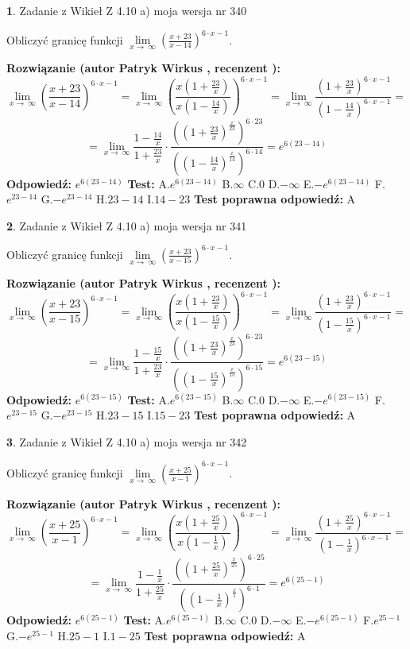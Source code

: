 \documentclass[12pt, a4paper]{article}
\theoremstyle{definition} %
\newtheorem{zad}{}
\newcommand{\zadStart}[1]{\begin{zad}#1\newline}
\newcommand{\zadStop}{\end{zad}}
\newcommand{\rozwStart}[2]{\noindent \textbf{Rozwiązanie (autor #1 , recenzent #2): }\newline}
\newcommand{\rozwStop}{\newline}
\newcommand{\odpStart}{\noindent \textbf{Odpowiedź:}\newline}
\newcommand{\odpStop}{\newline}
\newcommand{\testStart}{\noindent \textbf{Test:}\newline}
\newcommand{\testStop}{\newline}
\newcommand{\kluczStart}{\noindent \textbf{Test poprawna odpowiedź:}\newline}
\newcommand{\kluczStop}{\newline}
\begin{document}
\zadStart{Zadanie z Wikieł Z 4.10 a) moja wersja nr 340}


Obliczyć granicę funkcji  $\lim\limits_{x\to\ \infty}(\frac{x+23}{x-14})^{6\cdot x-1}$.
\zadStop
\rozwStart{Patryk Wirkus}{}
$$\lim\limits_{x\to\ \infty}(\frac{x+23}{x-14})^{6\cdot x-1} = \lim\limits_{x\to\ \infty}(\frac{x(1+\frac{23}{x})}{x(1-\frac{14}{x})})^{6\cdot x-1}=\lim\limits_{x\to\ \infty}\frac{(1+\frac{23}{x})^{6\cdot x-1}}{(1-\frac{14}{x})^{6\cdot x-1}}=$$
$$=\lim\limits_{x\to\ \infty}\frac{1-\frac{14}{x}}{1+\frac{23}{x}}\cdot\frac{((1+\frac{23}{x})^{\frac{x}{23}})^{6\cdot23}}{((1-\frac{14}{x})^{\frac{x}{14}})^{6\cdot14}}=e^{6(23-14)}$$
\rozwStop
\odpStart
$e^{6(23-14)}$
\odpStop
\testStart
A.$e^{6(23-14)}$ B.$\infty$ C.$0$ D.$-\infty$ E.$-e^{6(23-14)}$
F.$e^{23-14}$ G.$-e^{23-14}$
H.$23-14$
I.$14-23$
\testStop
\kluczStart
A
\kluczStop



\zadStart{Zadanie z Wikieł Z 4.10 a) moja wersja nr 341}


Obliczyć granicę funkcji  $\lim\limits_{x\to\ \infty}(\frac{x+23}{x-15})^{6\cdot x-1}$.
\zadStop
\rozwStart{Patryk Wirkus}{}
$$\lim\limits_{x\to\ \infty}(\frac{x+23}{x-15})^{6\cdot x-1} = \lim\limits_{x\to\ \infty}(\frac{x(1+\frac{23}{x})}{x(1-\frac{15}{x})})^{6\cdot x-1}=\lim\limits_{x\to\ \infty}\frac{(1+\frac{23}{x})^{6\cdot x-1}}{(1-\frac{15}{x})^{6\cdot x-1}}=$$
$$=\lim\limits_{x\to\ \infty}\frac{1-\frac{15}{x}}{1+\frac{23}{x}}\cdot\frac{((1+\frac{23}{x})^{\frac{x}{23}})^{6\cdot23}}{((1-\frac{15}{x})^{\frac{x}{15}})^{6\cdot15}}=e^{6(23-15)}$$
\rozwStop
\odpStart
$e^{6(23-15)}$
\odpStop
\testStart
A.$e^{6(23-15)}$ B.$\infty$ C.$0$ D.$-\infty$ E.$-e^{6(23-15)}$
F.$e^{23-15}$ G.$-e^{23-15}$
H.$23-15$
I.$15-23$
\testStop
\kluczStart
A
\kluczStop



\zadStart{Zadanie z Wikieł Z 4.10 a) moja wersja nr 342}


Obliczyć granicę funkcji  $\lim\limits_{x\to\ \infty}(\frac{x+25}{x-1})^{6\cdot x-1}$.
\zadStop
\rozwStart{Patryk Wirkus}{}
$$\lim\limits_{x\to\ \infty}(\frac{x+25}{x-1})^{6\cdot x-1} = \lim\limits_{x\to\ \infty}(\frac{x(1+\frac{25}{x})}{x(1-\frac{1}{x})})^{6\cdot x-1}=\lim\limits_{x\to\ \infty}\frac{(1+\frac{25}{x})^{6\cdot x-1}}{(1-\frac{1}{x})^{6\cdot x-1}}=$$
$$=\lim\limits_{x\to\ \infty}\frac{1-\frac{1}{x}}{1+\frac{25}{x}}\cdot\frac{((1+\frac{25}{x})^{\frac{x}{25}})^{6\cdot25}}{((1-\frac{1}{x})^{\frac{x}{1}})^{6\cdot1}}=e^{6(25-1)}$$
\rozwStop
\odpStart
$e^{6(25-1)}$
\odpStop
\testStart
A.$e^{6(25-1)}$ B.$\infty$ C.$0$ D.$-\infty$ E.$-e^{6(25-1)}$
F.$e^{25-1}$ G.$-e^{25-1}$
H.$25-1$
I.$1-25$
\testStop
\kluczStart
A
\kluczStop
\end{document}
